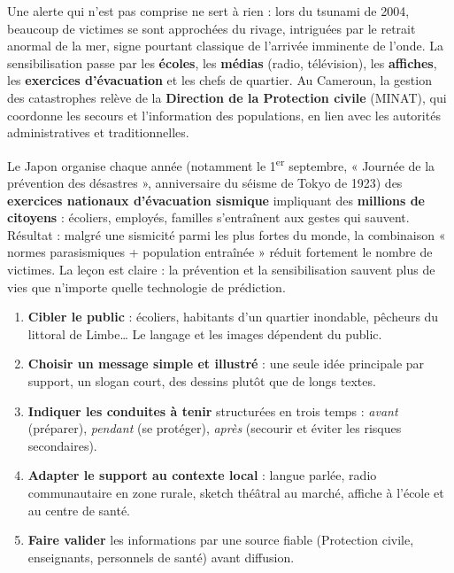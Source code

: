 \documentclass[11pt]{article}
\begin{document}
Une alerte qui n'est pas comprise ne sert à rien : lors du tsunami de 2004, beaucoup de victimes se sont approchées du rivage, intriguées par le retrait anormal de la mer, signe pourtant classique de l'arrivée imminente de l'onde. La sensibilisation passe par les \textbf{écoles}, les \textbf{médias} (radio, télévision), les \textbf{affiches}, les \textbf{exercices d'évacuation} et les chefs de quartier. Au Cameroun, la gestion des catastrophes relève de la \textbf{Direction de la Protection civile} (MINAT), qui coordonne les secours et l'information des populations, en lien avec les autorités administratives et traditionnelles.

\begin{savaistu}
Le Japon organise chaque année (notamment le 1\textsuperscript{er} septembre, « Journée de la prévention des désastres », anniversaire du séisme de Tokyo de 1923) des \textbf{exercices nationaux d'évacuation sismique} impliquant des \textbf{millions de citoyens} : écoliers, employés, familles s'entraînent aux gestes qui sauvent. Résultat : malgré une sismicité parmi les plus fortes du monde, la combinaison « normes parasismiques + population entraînée » réduit fortement le nombre de victimes. La leçon est claire : la prévention et la sensibilisation sauvent plus de vies que n'importe quelle technologie de prédiction.
\end{savaistu}

\begin{methode}
\begin{enumerate}
\item \textbf{Cibler le public} : écoliers, habitants d'un quartier inondable, pêcheurs du littoral de Limbe\ldots{} Le langage et les images dépendent du public.
\item \textbf{Choisir un message simple et illustré} : une seule idée principale par support, un slogan court, des dessins plutôt que de longs textes.
\item \textbf{Indiquer les conduites à tenir} structurées en trois temps : \emph{avant} (préparer), \emph{pendant} (se protéger), \emph{après} (secourir et éviter les risques secondaires).
\item \textbf{Adapter le support au contexte local} : langue parlée, radio communautaire en zone rurale, sketch théâtral au marché, affiche à l'école et au centre de santé.
\item \textbf{Faire valider} les informations par une source fiable (Protection civile, enseignants, personnels de santé) avant diffusion.
\end{enumerate}
\end{methode}
\end{document}
